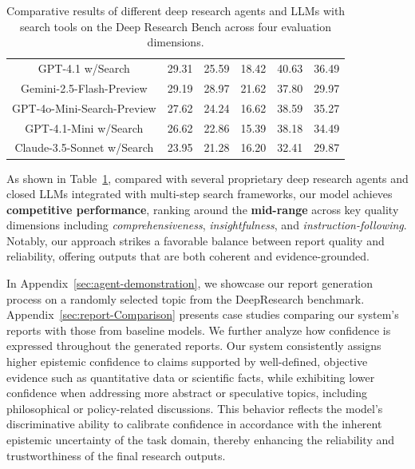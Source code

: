 \documentclass[11pt]{article}
\begin{document}
\begin{table}[t]
\begin{center}
{\begin{tabular}{c|ccccc}
                GPT-4.1 w/Search & 29.31 & 25.59 & 18.42 & 40.63 & 36.49 \\
                Gemini-2.5-Flash-Preview & 29.19 & 28.97 & 21.62 & 37.80 & 29.97 \\
                GPT-4o-Mini-Search-Preview & 27.62 & 24.24 & 16.62 & 38.59 & 35.27 \\
                GPT-4.1-Mini w/Search & 26.62 & 22.86 & 15.39 & 38.18 & 34.49 \\
                Claude-3.5-Sonnet w/Search & 23.95 & 21.28 & 16.20 & 32.41 & 29.87 \\
                \midrule\bottomrule[1pt]
            \end{tabular}
        }
    \end{center}
    \vspace{-0.2cm}
    \caption{Comparative results of different deep research agents and LLMs with search tools on the Deep Research Bench across four evaluation dimensions.}
    \label{tab:drb-results}
\end{table}

 As shown in Table~\ref{tab:drb-results}, compared with several proprietary deep research agents and closed LLMs integrated with multi-step search frameworks, our model achieves \textbf{competitive performance}, ranking around the \textbf{mid-range} across key quality dimensions including \textit{comprehensiveness}, \textit{insightfulness}, and \textit{instruction-following}. Notably, our approach strikes a favorable balance between report quality and reliability, offering outputs that are both coherent and evidence-grounded.

In Appendix~\ref{sec:agent-demonstration}, we showcase our report generation process on a randomly selected topic from the DeepResearch benchmark. Appendix~\ref{sec:report-Comparison} presents case studies comparing our system’s reports with those from baseline models. We further analyze how confidence is expressed throughout the generated reports. Our system consistently assigns higher epistemic confidence to claims supported by well-defined, objective evidence such as quantitative data or scientific facts, while exhibiting lower confidence when addressing more abstract or speculative topics, including philosophical or policy-related discussions. This behavior reflects the model’s discriminative ability to calibrate confidence in accordance with the inherent epistemic uncertainty of the task domain, thereby enhancing the reliability and trustworthiness of the final research outputs.
\end{document}

